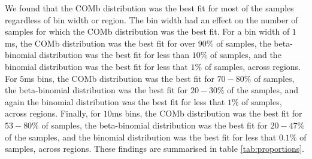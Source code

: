 \documentclass[a4paper,12pt]{article}
\theoremstyle{definition}
\begin{document}
  We found that the COMb distribution was the best fit for most of the samples regardless of bin width or region. The bin width had an effect on the number of samples for which the COMb distribution was the best fit. For a bin width of $1$ms, the COMb distribution was the best fit for over $90\%$ of samples, the beta-binomial distribution was the best fit for less than $10\%$ of samples, and the binomial distribution was the best fit for less that $1\%$ of samples, across regions. For $5$ms bins, the COMb distribution was the best fit for $70-80\%$ of samples, the beta-binomial distribution was the best fit for $20-30\%$ of the samples, and again the binomial distribution was the best fit for less that $1\%$ of samples, across regions. Finally, for $10$ms bins,  the COMb distribution was the best fit for $53-80\%$ of samples, the beta-binomial distribution was the best fit for $20-47\%$ of the samples, and the binomial distribution was the best fit for less that $0.1\%$ of samples, across regions. These findings are summarised in table \ref{tab:proportions}.

  \newpage
\end{document}
